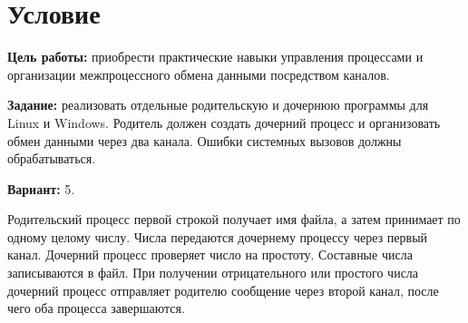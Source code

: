 \section{Условие}
{\bfseries Цель работы:} приобрести практические навыки управления процессами и организации межпроцессного обмена данными посредством каналов.

{\bfseries Задание:} реализовать отдельные родительскую и дочернюю программы для Linux и Windows. Родитель должен создать дочерний процесс и организовать обмен данными через два канала. Ошибки системных вызовов должны обрабатываться.

{\bfseries Вариант:} 5.

Родительский процесс первой строкой получает имя файла, а затем принимает по одному целому числу. Числа передаются дочернему процессу через первый канал. Дочерний процесс проверяет число на простоту. Составные числа записываются в файл. При получении отрицательного или простого числа дочерний процесс отправляет родителю сообщение через второй канал, после чего оба процесса завершаются.
